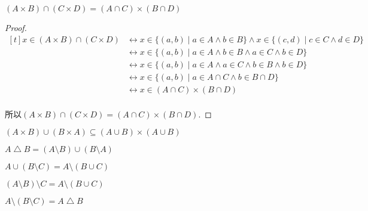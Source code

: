 \begin{proposition}
	$(A\times B)\cap (C\times D)=(A\cap C)\times (B\cap D)$
\end{proposition}

\begin{proof}
	$\begin{aligned}[t]
		x\in (A\times B)\cap (C\times D) & \leftrightarrow x\in \{(a,b)\mid a\in A\wedge b\in B\}\wedge x\in \{(c,d)\mid c\in C\wedge d\in D\}\\
		& \leftrightarrow x\in \{(a,b)\mid a\in A\wedge b\in B\wedge a\in C\wedge b\in D\}\\
		& \leftrightarrow x\in \{(a,b)\mid a\in A\wedge a\in C\wedge b\in B\wedge b\in D\}\\
		& \leftrightarrow x\in \{(a,b)\mid a\in A\cap C\wedge b\in B\cap D\}\\
		& \leftrightarrow x\in (A\cap C)\times (B\cap D)\\
	\end{aligned}$
	
	所以$(A\times B)\cap (C\times D)=(A\cap C)\times (B\cap D)$.
\end{proof}

\begin{proposition}
	$(A\times B)\cup (B\times A)\subseteq (A\cup B)\times (A\cup B)$
\end{proposition}

\begin{definition}
	$A\bigtriangleup  B=(A\setminus B)\cup (B\setminus A)$
\end{definition}

\begin{proposition}
	$A\cup (B\setminus C)=A\setminus (B\cup C)$

	$(A\setminus B)\setminus C=A\setminus (B\cup C)$

	$A\setminus (B\setminus C)=A\bigtriangleup B$
\end{proposition}
